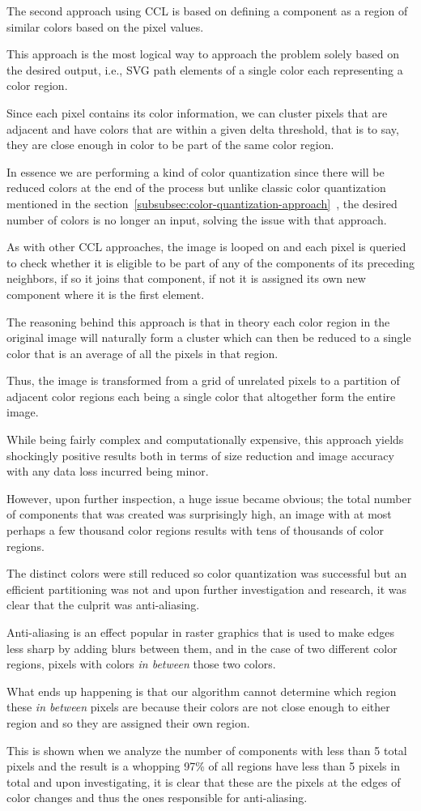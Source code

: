 \documentclass[12pt]{article}
\newcommand{\sentence}{} %
\newcommand{\italic}[1]{\textit{#1}}
\newcommand{\fullref}[1]{\ref{#1}~\nameref{#1}}
\begin{document}
    \tab
    The second approach using CCL is based on defining a component as a region of similar colors based on the pixel
    values.
    \sentence
    This approach is the most logical way to approach the problem solely based on the desired output, i.e., SVG path
    elements of a single color each representing a color region.
    \sentence
    Since each pixel contains its color information, we can cluster pixels that are adjacent and have colors that are
    within a given delta threshold, that is to say, they are close enough in color to be part of the same color
    region.
    \sentence
    In essence we are performing a kind of color quantization since there will be reduced colors at the end of the
    process but unlike classic color quantization mentioned in the
    section~\fullref{subsubsec:color-quantization-approach}, the desired number of colors is no longer an input,
    solving the issue with that approach.
    \sentence
    As with other CCL approaches, the image is looped on and each pixel is queried to check whether it is eligible to
    be part of any of the components of its preceding neighbors, if so it joins that component, if not it is assigned
    its own new component where it is the first element.
    \sentence
    The reasoning behind this approach is that in theory each color region in the original image will naturally form
    a cluster which can then be reduced to a single color that is an average of all the pixels in that region.
    \sentence
    Thus, the image is transformed from a grid of unrelated pixels to a partition of adjacent color regions each
    being a single color that altogether form the entire image.
    \sentence

    \bigskip
    While being fairly complex and computationally expensive, this approach yields shockingly positive results both
    in terms of size reduction and image accuracy with any data loss incurred being minor.
    \sentence
    However, upon further inspection, a huge issue became obvious;
    the total number of components that was created was surprisingly high, an image with at most perhaps a few
    thousand color regions results with tens of thousands of color regions.
    \sentence
    The distinct colors were still reduced so color quantization was successful but an efficient partitioning was not
    and upon further investigation and research, it was clear that the culprit was anti-aliasing.
    \sentence
    Anti-aliasing is an effect popular in raster graphics that is used to make edges less sharp by adding blurs
    between them, and in the case of two different color regions, pixels with colors \italic{in between} those two
    colors.
    \sentence
    What ends up happening is that our algorithm cannot determine which region these \italic{in between} pixels are
    because their colors are not close enough to either region and so they are assigned their own region.
    \sentence
    This is shown when we analyze the number of components with less than 5 total pixels and the result is a whopping
    97\% of all regions have less than 5 pixels in total and upon investigating, it is clear that these are the
    pixels at the edges of color changes and thus the ones responsible for anti-aliasing.
    \sentence
\end{document}
